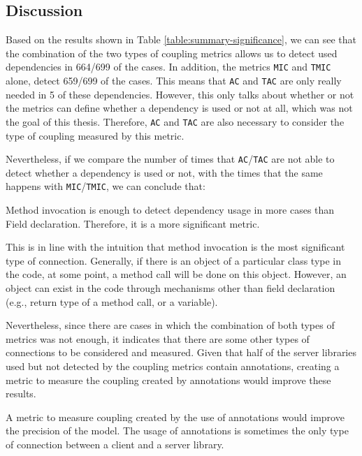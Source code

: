 \subsection{Discussion}

Based on the results shown in Table \ref{table:summary-significance}, we can see that the combination of the two types of coupling metrics allows us to detect used dependencies in 664/699 of the cases. In addition, the metrics \texttt{MIC} and \texttt{TMIC} alone, detect 659/699 of the cases. This means that \texttt{AC} and \texttt{TAC} are only really needed in 5 of these dependencies. However, this only talks about whether or not the metrics can define whether a dependency is used or not at all, which was not the goal of this thesis. Therefore, \texttt{AC} and \texttt{TAC} are also necessary to consider the type of coupling measured by this metric.

Nevertheless, if we compare the number of times that \texttt{AC}/\texttt{TAC} are not able to detect whether a dependency is used or not, with the times that the same happens with \texttt{MIC}/\texttt{TMIC}, we can conclude that:

\begin{finding}
	Method invocation is enough to detect dependency usage in more cases than Field declaration. Therefore, it is a more significant metric.
	\label{find:significance-mic}
\end{finding}

This is in line with the intuition that method invocation is the most significant type of connection. Generally, if there is an object of a particular class type in the code, at some point, a method call will be done on this object. However, an object can exist in the code through mechanisms other than field declaration (e.g., return type of a method call, or a variable).

Nevertheless, since there are cases in which the combination of both types of metrics was not enough, it indicates that there are some other types of connections to be considered and measured. Given that half of the server libraries used but not detected by the coupling metrics contain annotations, creating a metric to measure the coupling created by annotations would improve these results.

\begin{finding}
	A metric to measure coupling created by the use of annotations would improve the precision of the model. The usage of annotations is sometimes the only type of connection between a client and a server library.
	\label{find:significance-annotations}
\end{finding}


